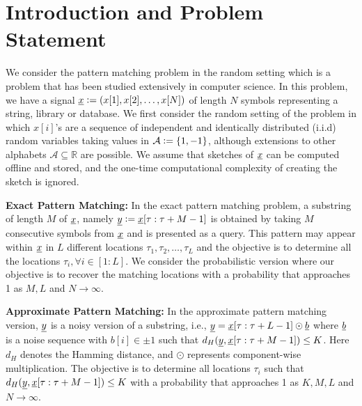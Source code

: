 \section{Introduction and Problem Statement}
\label{sec:introduction}
We consider the pattern matching problem in the random setting which is a problem that has been studied extensively in computer science. In this problem, we have a signal $\underline{x} \mathrel{\mathop:}= (x[1], x[2],\ldots, x[N])$ of length $N$ symbols representing a string, library or database. We first consider the random setting of the problem in which $x[i]$'s are a sequence of independent and identically distributed (i.i.d) random variables taking values in $\mathcal{A} \mathrel{\mathop:}= \{1,-1\}$, although extensions to other alphabets $\mathcal{A} \subseteq \mathbb{R}$ are possible. We assume that sketches of $\underline{x}$ can be computed offline and stored, and the one-time computational complexity of creating the sketch is ignored.

{\bf Exact Pattern Matching:} In the exact pattern matching problem, a substring of length $M$ of $\underline{x}$, namely $\underline{y} \mathrel{\mathop:}= \underline{x}[\tau:\tau+M-1]$ is obtained by taking $M$ consecutive symbols from $\underline{x}$ and is presented as a query. This pattern may appear within $\underline{x}$ in $L$ different locations $\tau_1,\tau_2,\ldots,\tau_L$ and the objective is to determine all the locations $\tau_i, \forall i\in[1:L]$. We consider the probabilistic version where our objective is to recover the matching locations with a probability that approaches 1 as $M, L$ and $N \rightarrow \infty$.

{\bf Approximate Pattern Matching:} In the approximate pattern matching version, $\underline{y}$ is a noisy version of a substring, i.e., $\underline{y} = \underline{x}[\tau:\tau+L-1] \odot \underline{b}$ where $\underline{b}$ is a noise sequence with $b[i] \in \pm 1$ such that $d_H(\underline{y},\underline{x}[\tau:\tau+M-1]) \leq K$. Here $d_H$ denotes the Hamming distance, and $\odot$ represents component-wise multiplication. The objective is to determine all locations $\tau_i$ such that $d_H(\underline{y},\underline{x}[\tau:\tau+M-1]) \leq K$ with a probability that approaches 1 as $K, M, L$ and $N \rightarrow \infty$.

